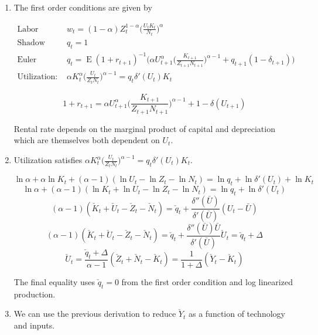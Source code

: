 \documentclass[11pt]{article}
\DeclareMathOperator{\ev}{E}
\begin{document}
    \begin{enumerate}

        \item The first order conditions are given by

            \begin{align*}
                \text{Labor demand:~} & w_t = (1-\alpha) Z_t^{1-\alpha} \bigg ( \frac{U_t K_t}{N_t} \bigg )^\alpha \\
                \text{Shadow value of capital:~} & q_t = 1 \\
                \text{Euler equation:~} & q_t = \ev (1+r_{t+1})^{-1} \bigg ( \alpha U_{t+1}^\alpha \bigg ( \frac{K_{t+1}}{Z_{t+1} N_{t+1}} \bigg )^{\alpha-1} + q_{t+1} (1-\delta_{t+1}) \bigg ) \\
                \text{Utilization:~} & \alpha K_t^\alpha \bigg ( \frac{U_t}{Z_t N_t} \bigg )^{\alpha-1} = q_t \delta'(U_t) K_t
            \end{align*}

            $$ 1 + r_{t+1} = \alpha U_{t+1}^\alpha \bigg ( \frac{K_{t+1}}{Z_{t+1} N_{t+1}} \bigg )^{\alpha-1} + 1 - \delta(U_{t+1}) $$

        Rental rate depends on the marginal product of capital and depreciation which are themselves both dependent on $U_t$.

        \item Utilization satisfies $\alpha K_t^\alpha \big ( \frac{U_t}{Z_t N_t} \big )^{\alpha-1} = q_t \delta'(U_t) K_t$.

            $$ \ln \alpha + \alpha \ln K_t + (\alpha - 1) (\ln U_t - \ln Z_t - \ln N_t) = \ln q_t + \ln \delta'(U_t) + \ln K_t $$
            $$ \ln \alpha + (\alpha - 1) (\ln K_t + \ln U_t - \ln Z_t - \ln N_t) = \ln q_t + \ln \delta'(U_t) $$
            $$ (\alpha - 1) (\check K_t + \check U_t - \check Z_t - \check N_t) = \check q_t + \frac{\delta''(\bar U)}{\delta'(\bar U)} (U_t - \bar U) $$
            $$ (\alpha - 1) (\check K_t + \check U_t - \check Z_t - \check N_t) = \check q_t + \frac{\delta''(\bar U) \bar U}{\delta'(\bar U)} \check U_t = \check q_t + \Delta $$
            $$ \check U_t = \frac{\check q_t + \Delta}{\alpha - 1} (\check Z_t + \check N_t - \check K_t) = \frac{1}{1+\Delta} (\check Y_t - \check K_t) $$

        The final equality uses $\check q_t = 0$ from the first order condition and log linearized production.

        \item We can use the previous derivation to reduce $\check Y_t$ as a function of technology and inputs.


\end{enumerate}
\end{document}
